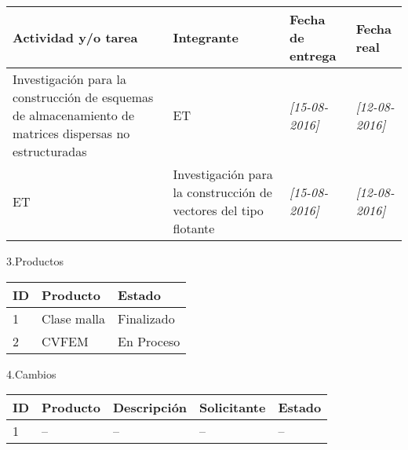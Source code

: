 \documentclass[12pt]{report}
\numberwithin{equation}{section}
\begin{document}
\begin{flushleft}
\begin{longtable}[H]{|m{5cm}|m{3cm}|m{3cm}|m{3cm}|}
\hline
\small{\textbf{Actividad y/o tarea }} &\small{ \textbf{Integrante}} & \small{\textbf{Fecha de entrega}} & \small{\textbf{Fecha real}}\\
\hline \hline
\endhead
\hline
\endfoot

\endlastfoot
\hline
\hline
\small{Investigaci\'on para la construcci\'on de esquemas de almacenamiento de matrices dispersas no estructuradas} & \small{ET} &\small{ \textit{[15-08-2016]}} & \small{\textit{[12-08-2016]}}\\
\hline
\small{ET} &\small{Investigaci\'on para la construcci\'on de vectores del tipo flotante} &\small{ \textit{[15-08-2016]}} & \small{\textit{[12-08-2016]}}\\
\hline
\hline
\end{longtable}

\newpage

\large{3.Productos }
\begin{table}[H]
\begin{tabular}{|m{0.5cm}|m{7.5cm}|m{6cm}|}
\hline 
\textbf{ID } & \textbf{Producto} & \textbf{Estado} \\
\hline
\hline
 1 & \small{Clase malla} & \small{Finalizado}\\
\hline
 2 & \small{CVFEM} & \small{En Proceso}\\
\hline
\end{tabular}
\label{tabla: TABLA CE Productos}
\end{table}



\large{4.Cambios}\\

\begin{table}[H]
\begin{tabular}{|m{0.5cm}|m{2cm}|m{4.5cm}|m{3.5cm}|m{3.5cm}|}
\hline 
\textbf{ID} & \textbf{Producto} & \textbf{Descripci\'on} & \textbf{Solicitante} & \textbf{Estado}  \\
\hline
\hline
1 & \small{--}  & \small{--} &\small{--} & \small{--}\\
\hline
\end{tabular}
\label{tabla: TABLA CE Cambios Seg}
\end{table}




\end{flushleft}
\end{document}
